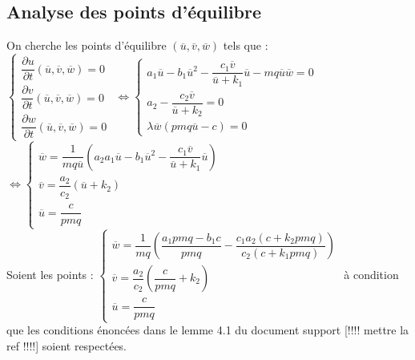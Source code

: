 \documentclass[a4paper, 11pt]{report}%
\begin{document}
        \subsection{Analyse des points d'équilibre}
        On cherche les points d'équilibre $  \left( \overline{u},  \overline{v}, \overline{w} \right)$ tels que :\\
        $ \left\{
            \begin{array}{ll}
                \dfrac{\partial u}{\partial t} \left( \overline{u},  \overline{v}, \overline{w} \right) =0 \\
                \dfrac{\partial v}{\partial t} \left( \overline{u},  \overline{v}, \overline{w} \right) = 0\\
                \dfrac{\partial w}{\partial t}  \left( \overline{u},  \overline{v}, \overline{w} \right) = 0
            \end{array}
        \right.$
        $ \Leftrightarrow \left\{ 
        	\begin{array}{ll}
                a_1 \overline{u} - b_1 \overline{u}^2 - \dfrac{c_1 \overline{v}}{\overline{u} + k_1} \overline{u} - mq \overline{u} \overline{w} =0 \\
                a_2 - \dfrac{c_2 \overline{v}}{\overline{u} + k_2} = 0\\
                \lambda \overline{w} \left( pmq \overline{u} - c \right) = 0
            \end{array}
        \right.$
        $ \Leftrightarrow \left\{ 
        	\begin{array}{ll}
                \overline{w} =  \dfrac{1}{mq \overline{u}} \left(a_2 a_1 \overline{u} - b_1 \overline{u}^2 - \dfrac{c_1 \overline{v}}{\overline{u} + k_1} \overline{u} \right)\\
                \overline{v} = \dfrac{a_2}{c_2} \left( \overline{u} + k_2 \right)\\
                \overline{u} = \dfrac{c}{pmq}
            \end{array}
        \right.$
        \\
            Soient les points :
            $\left\{ 
        	\begin{array}{ll}
                \overline{w} = \dfrac{1}{mq} \left(  \dfrac{a_1pmq-b_1c}{pmq} - \dfrac{c_1a_2(c+k_2pmq)}{c_2(c+k_1pmq)}    \right)\\
                \overline{v} =  \dfrac{a_2}{c_2} \left( \dfrac{c}{pmq} + k_2 \right)\\
                \overline{u} = \dfrac{c}{pmq}
            \end{array}
        \right.$
        à condition que les conditions énoncées dans le lemme 4.1 du document support [!!!! mettre la ref !!!!] soient respectées.
        
\end{document}
